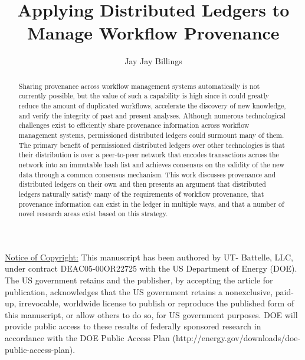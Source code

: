 \documentclass[sigconf]{acmart}
\begin{document}
\title{Applying Distributed Ledgers to Manage Workflow Provenance}

\author{Jay Jay Billings}


\begin{abstract}
Sharing provenance across workflow management systems automatically is not currently possible, but the value of such a capability is high since it could greatly reduce the amount of duplicated workflows, accelerate the discovery of new knowledge, and verify the integrity of past and present analyses. Although numerous technological challenges exist to efficiently share provenance information across workflow management systems, permissioned distributed ledgers could surmount many of them. The primary benefit of permissioned distributed ledgers over other technologies is that their distribution is over a peer-to-peer network that encodes transactions across the network into an immutable hash list and achieves consensus on the validity of the new data through a common consensus mechanism. This work discusses provenance and distributed ledgers on their own and then presents an argument that distributed ledgers naturally satisfy many of the requirements of workflow provenance, that provenance information can exist in the ledger in multiple ways, and that a number of novel research areas exist based on this strategy.
\end{abstract}



\maketitle

\underline{Notice of Copyright:} This manuscript has been authored by UT-
Battelle, LLC, under contract DEAC05-00OR22725 with the US Department of
Energy (DOE). The US government retains and the publisher, by accepting
the article for publication, acknowledges that the US government
retains a nonexclusive, paid-up, irrevocable, worldwide license to publish or
reproduce the published form of this manuscript, or allow others to do so, for
US government purposes. DOE will provide
public access to these results of federally sponsored research in accordance
with the DOE Public Access Plan (http://energy.gov/downloads/doe-public-access-plan).





\end{document}
